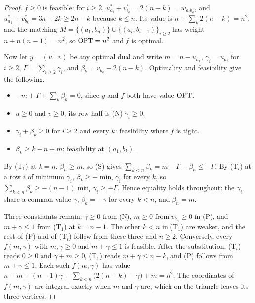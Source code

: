 \begin{proof}
$f \ge 0$ is feasible: for $i \ge 2$, $u^*_{a_i} + v^*_{b_k} = 2(n-k) = w_{a_i b_k}$, and
$u^*_{a_1} + v^*_{b_k} = 3n-2k \ge 2n-k$ because $k \le n$. Its value is $n + \sum_k 2(n-k) = n^2$,
and the matching $M = \{(a_1,b_n)\} \cup \{(a_i,b_{i-1})\}_{i \ge 2}$ has weight $n + n(n-1) = n^2$,
so $\mathrm{OPT} = n^2$ and $f$ is optimal.

Now let $y = (u \mid v)$ be any optimal dual and write $m = n - u_{a_1}$, $\gamma_i = u_{a_i}$ for
$i \ge 2$, $\Gamma = \sum_{i \ge 2} \gamma_i$, and $\beta_k = v_{b_k} - 2(n-k)$. Optimality and
feasibility give the following.
\begin{itemize}
\item[(S)] $-m + \Gamma + \sum_k \beta_k = 0$, since $y$ and $f$ both have value $\mathrm{OPT}$.
\item[(P)] $u \ge 0$ and $v \ge 0$; its row half is (N) $\gamma_i \ge 0$.
\item[(T$_i$)] $\gamma_i + \beta_k \ge 0$ for $i \ge 2$ and every $k$: feasibility where $f$ is
  tight.
\item[(T$_1$)] $\beta_k \ge k - n + m$: feasibility at $(a_1, b_k)$.
\end{itemize}
By (T$_1$) at $k = n$, $\beta_n \ge m$, so (S) gives $\sum_{k<n} \beta_k = m - \Gamma - \beta_n \le
-\Gamma$. By (T$_i$) at a row $i$ of minimum $\gamma_i$, $\beta_k \ge -\min_i \gamma_i$ for every
$k$, so $\sum_{k<n} \beta_k \ge -(n-1)\min_i \gamma_i \ge -\Gamma$. Hence equality holds throughout:
the $\gamma_i$ share a common value $\gamma$, $\beta_k = -\gamma$ for every $k < n$, and
$\beta_n = m$.

Three constraints remain: $\gamma \ge 0$ from (N), $m \ge 0$ from $v_{b_n} \ge 0$ in (P), and
$m + \gamma \le 1$ from (T$_1$) at $k = n-1$. The other $k < n$ in (T$_1$) are
weaker, and the rest of (P) and of (T$_i$) follow from these three and $n \ge 2$. Conversely, every
$f(m,\gamma)$ with $m, \gamma \ge 0$ and $m + \gamma \le 1$ is feasible. After the substitution,
(T$_i$) reads $0 \ge 0$ and $\gamma + m \ge 0$, (T$_1$) reads $m + \gamma \le n - k$, and (P)
follows from $m + \gamma \le 1$. Each such $f(m,\gamma)$ has value
$n - m + (n-1)\gamma + \sum_{k<n}\bigl(2(n-k) - \gamma\bigr) + m = n^2$. The coordinates of
$f(m,\gamma)$ are integral exactly when $m$ and $\gamma$ are, which on the triangle leaves its
three vertices.
\end{proof}

